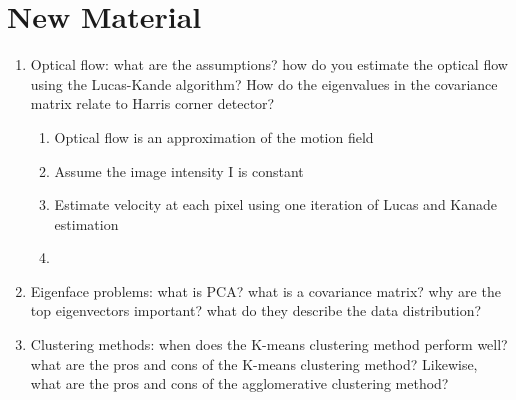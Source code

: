 \documentclass[12pt,letterpaper]{article}
\begin{document}
\section{New Material}
\begin{enumerate}
    \item Optical flow: what are the assumptions? how do you estimate the optical flow using  the Lucas-Kande algorithm? How do the eigenvalues in the covariance matrix relate to Harris corner detector? \\
    \color{red}
    \begin{enumerate}
        \item Optical flow is an approximation of the motion field
        \item Assume the image intensity  I  is constant
        \item Estimate velocity at each pixel using one iteration of Lucas and Kanade estimation
        \item 
    \end{enumerate}
    \color{black}
    \item  Eigenface problems: what is PCA? what is a covariance matrix? why are the top eigenvectors important? what do they describe the data distribution?
    \item Clustering methods: when does the K-means clustering method perform well? what are the pros and cons of the K-means clustering method? Likewise, what are the pros and cons of the agglomerative clustering method?
\end{enumerate}
\end{document}
